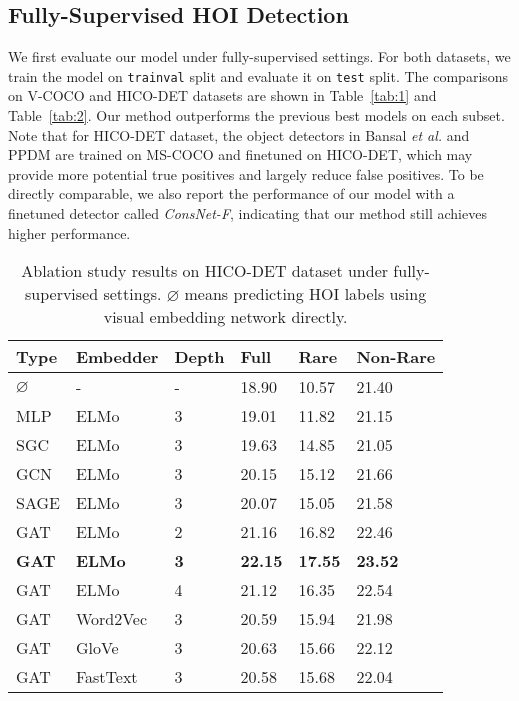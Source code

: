 \documentclass[sigconf,screen]{acmart}
\begin{document}
\subsection{Fully-Supervised HOI Detection}

We first evaluate our model under fully-supervised settings. For both datasets, we train the model on \verb|trainval| split and evaluate it on \verb|test| split. The comparisons on V-COCO and HICO-DET datasets are shown in Table~\ref{tab:1} and Table~\ref{tab:2}. Our method outperforms the previous best models on each subset. Note that for HICO-DET dataset, the object detectors in Bansal \textit{et al.} \cite{bansal2019detecting} and PPDM \cite{liao2020ppdm} are trained on MS-COCO and finetuned on HICO-DET, which may provide more potential true positives and largely reduce false positives. To be directly comparable, we also report the performance of our model with a finetuned detector called \textit{ConsNet-F}, indicating that our method still achieves higher performance.

\begin{table}
\renewcommand\tabcolsep{4pt}
\caption{Ablation study results on HICO-DET dataset under fully-supervised settings. $\varnothing$ means predicting HOI labels using visual embedding network directly.}
\label{tab:4}
\begin{tabularx}{\linewidth}{p{0.95cm}<{\centering}|p{1.55cm}<{\centering}|p{1cm}<{\centering}|p{1cm}<{\centering}p{1cm}<{\centering}p{1cm}<{\centering}p{1cm}<{\centering}}
\toprule
\textbf{Type}&\textbf{Embedder}&\textbf{Depth}&\textbf{Full}&\textbf{Rare}&\multicolumn{2}{l}{\hspace{-0.15cm}\textbf{Non-Rare}}\\
\midrule
$\varnothing$&-&-&18.90&10.57&21.40\\
MLP&ELMo&3&19.01&11.82&21.15\\
SGC&ELMo&3&19.63&14.85&21.05\\
GCN&ELMo&3&20.15&15.12&21.66\\
SAGE&ELMo&3&20.07&15.05&21.58\\
\midrule
GAT&ELMo&2&21.16&16.82&22.46\\
\textbf{GAT}&\textbf{ELMo}&\textbf{3}&\textbf{22.15}&\textbf{17.55}&\textbf{23.52}\\
GAT&ELMo&4&21.12&16.35&22.54\\
\midrule
GAT&Word2Vec&3&20.59&15.94&21.98\\
GAT&GloVe&3&20.63&15.66&22.12\\
GAT&FastText&3&20.58&15.68&22.04\\
\bottomrule
\end{tabularx}
\end{table}
\end{document}
